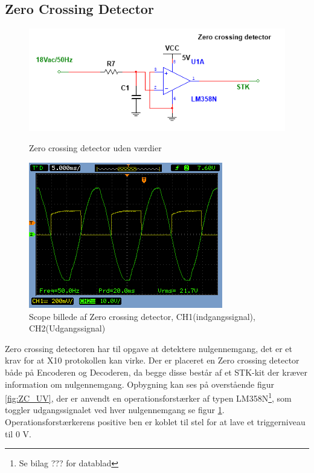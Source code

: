 \subsection{Zero Crossing Detector}
\begin{figure}[htb]
  \begin{minipage}{0.45\textwidth}
    \centering
      \includegraphics[width=\textwidth]{billeder/HWdesign/ZC_UV}
      \caption{Zero crossing detector uden værdier}
    \label{fig:ZC_UV}
  \end{minipage}
  \hspace{0.1\textwidth}
  \begin{minipage}{0.45\textwidth}
    \centering
      \includegraphics[width=\textwidth]{billeder/HWTest/Encoder/Encoder_zerocross}
      \caption{Scope billede af Zero crossing detector, CH1(indgangssignal), CH2(Udgangssignal)}
    \label{fig:Encoder_Zerocross}
  \end{minipage}
\end{figure}

Zero crossing detectoren har til opgave at detektere nulgennemgang, det er et krav for at X10 protokollen kan virke. Der er placeret en Zero crossing detector både på Encoderen og Decoderen, da begge disse består af et STK-kit der kræver information om nulgennemgang. Opbygning kan ses på overstående figur \ref{fig:ZC_UV}, der er anvendt en operationsforstærker af typen LM358N\footnote{Se bilag ??? for datablad}, som toggler udgangssignalet ved hver nulgennemgang se figur \ref{fig:Encoder_Zerocross}. Operationsforstærkerens positive ben er koblet til stel for at lave et triggerniveau til 0 V.

